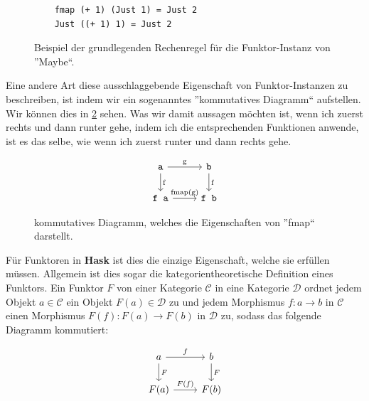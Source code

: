 \documentclass{hhuarticle}
\theoremstyle{definition}
\theoremstyle{theorem}
\begin{document}
  \begin{figure}[h]

    \begin{lstlisting}
    fmap (+ 1) (Just 1) = Just 2
    Just ((+ 1) 1) = Just 2
    \end{lstlisting}
    \caption{Beispiel der grundlegenden Rechenregel für die Funktor-Instanz von ''Maybe``.}%
    \label{fig:kommutativitaetFunktor}
  \end{figure}

  Eine andere Art diese ausschlaggebende Eigenschaft von Funktor-Instanzen
  zu beschreiben, ist indem wir ein sogenanntes ''kommutatives Diagramm``
  aufstellen. Wir können dies in \cref{fig:kommutativesDiagramm} sehen.
  Was wir damit aussagen möchten ist, wenn ich zuerst rechts und dann runter
  gehe, indem ich die entsprechenden Funktionen anwende, ist es das selbe,
  wie wenn ich zuerst runter und dann rechts gehe.

  \begin{figure}[h]
    \[
      \begin{tikzcd}
        \verb|a| \arrow[r, "\text{g}"] \arrow[d, "\text{f}"] & \verb|b| \arrow[d, "\text{f}"] \\
        \verb|f a| \arrow[r, "\text{fmap(g)}"]                   & \verb|f b|
      \end{tikzcd}
    \]
    \caption{kommutatives Diagramm, welches die Eigenschaften von ''fmap`` darstellt.}%
    \label{fig:kommutativesDiagramm}
  \end{figure}
  
  Für Funktoren in \textbf{Hask} ist dies die einzige Eigenschaft, welche
  sie erfüllen müssen. Allgemein ist dies sogar die kategorientheoretische
  Definition eines Funktors. Ein Funktor $F$ von einer Kategorie $\mathcal{C}$ in
  eine Kategorie $\mathcal{D}$ ordnet jedem Objekt $a \in \mathcal{C}$ ein
  Objekt $F(a) \in \mathcal{D}$ zu und jedem Morphismus $f : a \to b$ in
  $\mathcal{C}$ einen Morphismus $F(f) : F(a) \to F(b)$ in $\mathcal{D}$ zu,
  sodass das folgende Diagramm kommutiert:

  \[
    \begin{tikzcd}
      a \arrow[r, "f"] \arrow[d, "F"] & b \arrow[d, "F"] \\
      F(a) \arrow[r, "F(f)"]                   & F(b)
    \end{tikzcd}
  \]
\end{document}
